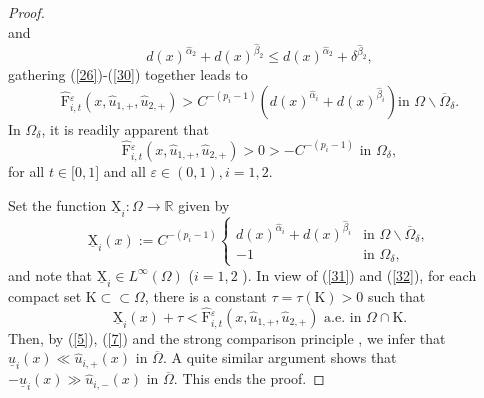 \documentclass[11pt]{amsart}
\theoremstyle{definition}
\theoremstyle{remark}
\numberwithin{equation}{section}
\begin{document}
\begin{proof}
\begin{equation}
\end{equation}
and 
\begin{equation}
d(x)^{\hat{\alpha}_{2}}+d(x)^{\hat{\beta}_{2}}\leq d(x)^{\hat{\alpha}
_{2}}+\delta ^{\hat{\beta}_{2}},  \label{30}
\end{equation}
gathering (\ref{26})-(\ref{30}) together leads to 
\begin{equation}
\widehat{\mathrm{F}}{_{i,t}^{\varepsilon }}({x,}\hat{u}_{1,+},\hat{u}
_{2,+})>C^{-(p_{i}-1)}(d(x)^{\hat{\alpha}_{i}}+d(x)^{\hat{\beta}_{i}})\text{
\ in\ }\Omega \backslash \overline{\Omega }_{\delta }.  \label{31}
\end{equation}
In $\Omega _{\delta }$, it is readily apparent that 
\begin{equation}
\widehat{\mathrm{F}}{_{i,t}^{\varepsilon }}({x,}\hat{u}_{1,+},\hat{u}
_{2,+})>0>-C^{-(p_{i}-1)}\text{ in }\Omega _{\delta },  \label{32}
\end{equation}
for all $t\in \lbrack 0,1]$ and all $\varepsilon \in (0,1),i=1,2$.

Set the function $\underline{\mathrm{X}}_{i}:\Omega \rightarrow \mathbb{R}$
given by 
\begin{equation*}
\underline{\mathrm{X}}_{i}(x):=C^{-(p_{i}-1)}\left\{ 
\begin{array}{ll}
d(x)^{\hat{\alpha}_{i}}+d(x)^{\hat{\beta}_{i}} & \text{in \ }\Omega
\backslash \overline{\Omega }_{\delta }, \\ 
-1 & \text{in \ }\Omega _{\delta },%
\end{array}
\right.
\end{equation*}
and note that $\underline{\mathrm{X}}_{i}\in L^{\infty }(\Omega )$ ($i=1,2$
). In view of (\ref{31}) and (\ref{32}), for each compact set $\mathrm{K}
\subset \subset \Omega $, there is a constant $\tau =\tau (\mathrm{K})>0$
such that 
\begin{equation*}
\underline{\mathrm{X}}_{i}(x)+\tau <\widehat{\mathrm{F}}{_{i,t}^{\varepsilon
}}({x,}\hat{u}_{1,+},\hat{u}_{2,+})\text{ a.e. in }\Omega \cap \mathrm{K}.
\end{equation*}
Then, by (\ref{5}), (\ref{7}) and the strong comparison principle \cite[
Proposition $2.6$ and Remark $2.8$]{AR}, we infer that $\underline{u}
_{i}(x)\ll \hat{u}_{i,+}(x)$ in $\overline{\Omega }$. A quite similar
argument shows that $-\underline{u}_{i}(x)\gg \hat{u}_{i,-}(x)$ in $%
\overline{\Omega }$. This ends the proof.
\end{proof}
\end{document}
